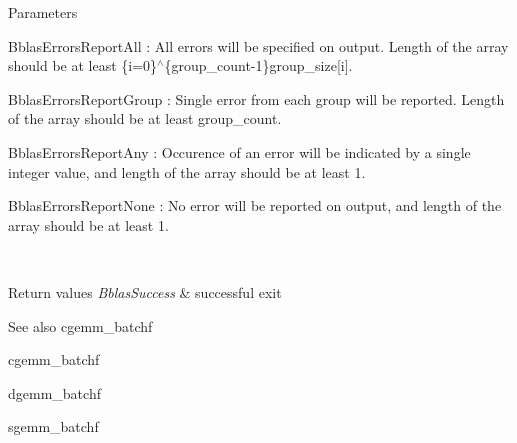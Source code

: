 \begin{DoxyParams}[1]{Parameters}
\begin{DoxyItemize}
\item Bblas\+Errors\+Report\+All \+: All errors will be specified on output. Length of the array should be at least \{i=0\}$^\wedge$\{group\+\_\+count-\/1\}group\+\_\+size\mbox{[}i\mbox{]}.
\item Bblas\+Errors\+Report\+Group \+: Single error from each group will be reported. Length of the array should be at least group\+\_\+count.
\item Bblas\+Errors\+Report\+Any \+: Occurence of an error will be indicated by a single integer value, and length of the array should be at least 1.
\item Bblas\+Errors\+Report\+None \+: No error will be reported on output, and length of the array should be at least 1.
\end{DoxyItemize}\\
\hline
\end{DoxyParams}

\begin{DoxyRetVals}{Return values}
{\em Bblas\+Success} & successful exit\\
\hline
\end{DoxyRetVals}
\begin{DoxySeeAlso}{See also}
cgemm\+\_\+batchf 

cgemm\+\_\+batchf 

dgemm\+\_\+batchf 

sgemm\+\_\+batchf 
\end{DoxySeeAlso}
